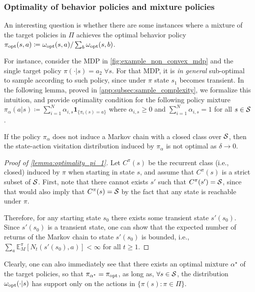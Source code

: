\subsubsection{Optimality of  behavior policies and mixture policies}
\label{app:optimality_behavior_policies}
An interesting question is whether there are some instances where a mixture of the target policies in $\Pi$ achieves the optimal behavior policy  $\pi_{\rm opt}(s,a)\coloneqq \omega_{\rm opt}(s,a)/\sum_b \omega_{\rm opt}(s,b)$.

For instance, consider the MDP in \cref{fig:example_non_convex_mdp} and the  single target policy $\pi(\cdot|s)=a_2\;\forall s$. For that MDP,  it is \emph{in general} sub-optimal to sample according to such policy, since under $\pi$ state $s_1$ becomes transient. In the following lemma, proved in \cref{app:subsec:sample_complexity}, we formalize this intuition, and provide optimality condition for the following policy mixture
  $
    \pi_\alpha(a | s) 
    \coloneqq
    \sum_{i=1}^N \alpha_{i,s}\mathbf{1}_{\{\pi_i(s)=a\}}
    $
    where $\alpha_{i,s} \ge 0$ and $
    \sum_{i=1}^N \alpha_{i,s} = 1$ for all $s\in {\cal S}$. 
    \begin{tcolorbox}
\begin{lemma}\label{lemma:optimality_pi_1}
 If the policy $\pi_\alpha$ does not induce a Markov chain with a closed class over ${\cal S}$, then the state-action visitation distribution induced by $\pi_\alpha$ is not optimal as $\delta\to 0$.
\end{lemma}
\end{tcolorbox}
\begin{proof}[Proof of \cref{lemma:optimality_pi_1}]
    Let $C^\pi(s)$ be the recurrent class (i.e., closed) induced by $\pi$ when starting in state $s$, and assume that $C^\pi(s)$ is a strict subset of ${\cal S}$. First, note that there cannot exists $s'$ such that $C^\pi(s')={\cal S}$, since that would also imply that $C^\pi(s)={\cal S}$ by the fact that any state is reachable under $\pi$. 

    Therefore, for any starting state $s_0$ there exists some transient state $s'(s_0)$. Since $s'(s_0)$ is a transient state, one can show that the expected  number of returns of the Markov chain to state $s'(s_0)$ is bounded, i.e., $\sum_a\mathbb{E}_M^\pi[N_t(s'(s_0),a)] <\infty$ for all $t\geq 1$.
\end{proof}

Clearly, one can also immediately see that there exists an optimal mixture $\alpha^\star$ of the target policies, so that $\pi_{\alpha^\star}=\pi_{\rm opt}$, as long as, $\forall s\in {\cal S}$, the distribution $\omega_{\rm opt}(\cdot|s)$ has support only on the actions in 
    $\{\pi(s): \pi \in \Pi\}$.

